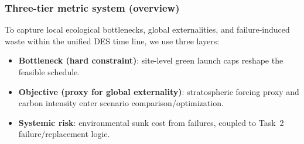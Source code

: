 ﻿\documentclass{mcmthesis}
\begin{document}
\subsubsection{Three-tier metric system (overview)}
To capture local ecological bottlenecks, global externalities, and failure-induced waste within the unified DES time line, we use three layers:
\begin{itemize}
    \item \textbf{Bottleneck (hard constraint)}: site-level green launch caps reshape the feasible schedule.
    \item \textbf{Objective (proxy for global externality)}: stratospheric forcing proxy and carbon intensity enter scenario comparison/optimization.
    \item \textbf{Systemic risk}: environmental sunk cost from failures, coupled to Task~2 failure/replacement logic.
\end{itemize}
\end{document}
